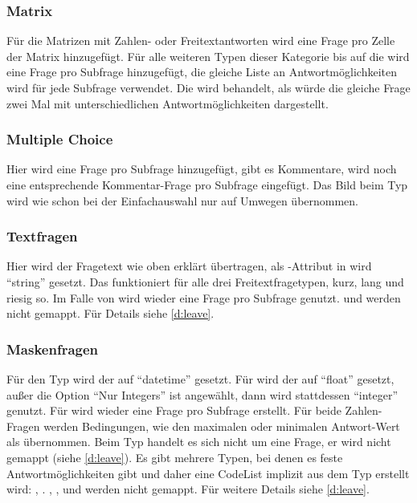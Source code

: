 \subsubsection{Matrix}

Für die Matrizen mit Zahlen- oder Freitextantworten wird eine Frage pro Zelle der Matrix hinzugefügt.
Für alle weiteren Typen dieser Kategorie bis auf die  wird eine Frage pro Subfrage hinzugefügt, die gleiche Liste an Antwortmöglichkeiten wird für jede Subfrage verwendet.
Die  wird behandelt, als würde die gleiche Frage zwei Mal mit unterschiedlichen Antwortmöglichkeiten dargestellt.

\subsubsection{Multiple Choice}

Hier wird eine Frage pro Subfrage hinzugefügt, gibt es Kommentare, wird noch eine entsprechende Kommentar-Frage pro Subfrage eingefügt.
Das Bild beim Typ  wird wie schon bei der Einfachauswahl nur auf Umwegen übernommen.

\subsubsection{Textfragen}

Hier wird der Fragetext wie oben erklärt übertragen, als -Attribut in  wird \enquote{string} gesetzt.
Das funktioniert für alle drei Freitextfragetypen, kurz, lang und riesig so.
Im Falle von  wird wieder eine Frage pro Subfrage genutzt.
 und  werden nicht gemappt. Für Details siehe \cref{d:leave}.

\subsubsection{Maskenfragen}

Für den Typ  wird der  auf \enquote{datetime} gesetzt.
Für  wird der  auf \enquote{float} gesetzt, außer die Option \enquote{Nur Integers} ist angewählt, dann wird stattdessen \enquote{integer} genutzt.
Für  wird wieder eine Frage pro Subfrage erstellt.
Für beide Zahlen-Fragen werden Bedingungen, wie den maximalen oder minimalen Antwort-Wert als  übernommen.
Beim Typ  handelt es sich nicht um eine Frage, er wird nicht gemappt (siehe \cref{d:leave}).
Es gibt mehrere Typen, bei denen es feste Antwortmöglichkeiten gibt und daher eine CodeList implizit aus dem Typ erstellt wird:
, .
, ,  und  werden nicht gemappt. Für weitere Details siehe \cref{d:leave}.

